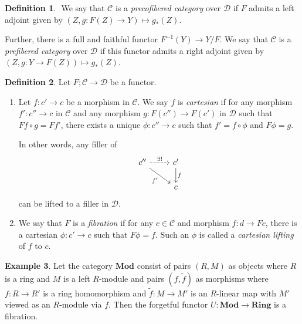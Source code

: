 \documentclass[10pt,letterpaper,cm]{nupset}
\theoremstyle{definition}
\newtheorem{definition}{Definition}[section]
\newtheorem{exmp}[definition]{Example}
\theoremstyle{theorem}
\theoremstyle{remark}
\newcommand{\1}{\mathbf{1}}
\renewcommand{\c}{\mathscr{C}}
\renewcommand{\d}{\mathscr{D}}
\newcommand{\0}{\vec 0}
\begin{document}
\begin{definition} $ $
We say that $\c$ is a \textit{precofibered category} over $\d$ if $F$ admits a left adjoint given by $\left(Z, g: F(Z) \to Y\right) \mapsto g_{\ast}(Z)$.
\end{definition}

Further, there is a full and faithful functor $F^{{-1}}(Y) \to Y/F$. We say that $\c$ is a \textit{prefibered category} over $\d$ if this functor admits a right adjoint given by $\left(Z, g: Y \to F(Z)\right) \mapsto g_{\ast}(Z)$.

\bigskip

\begin{definition}  Let $F ; \c \to \d$ be a functor.
\begin{enumerate}
\item Let $f: c' \to c$ be a morphism in $\c$. We say $f$ is \textit{cartesian} if for any morphism $f' : c'' \to c$ in $\c$ and any morphism $g : F(c'') \to F(c')$ in $\d$ such that $Ff \circ g = Ff'$, there exists a unique $\phi : c'' \to c$ such that $f' = f \circ \phi$ and $F\phi = g$.

 In other words, any filler of
\[ \begin{tikzcd}
c'' \arrow[r, dashed, "\exists!"] \arrow[swap, dr,  " f' "] & c' \arrow[d, "f"] \\%
 & c
\end{tikzcd}
\] can be lifted to a filler in $\d$.
\item We say that $F$ is a \textit{fibration} if for any $c \in \c$ and morphism $f: d \to Fc$, there is a cartesian $\phi : c' \to c$ such that $F\phi =f$. Such an $\phi$ is called a \textit{cartesian lifting} of $f$ to $c$.
\end{enumerate}
\end{definition}


\begin{exmp}
Let the category $\mathbf{Mod}$ consist of pairs $\left(R, M\right)$ as objects where  $R$ is a ring and $M$ is a left $R$-module and pairs $\left(f, \tilde{f}\right)$ as morphisms where $f: R \to R'$ is a ring homomorphism and $\tilde{f}: M \to M'$ is an $R$-linear map with $M'$ viewed as an $R$-module via $f$. Then the forgetful functor $U: \mathbf{Mod} \to \mathbf{Ring}$ is a fibration.
\end{exmp}
\end{document}
